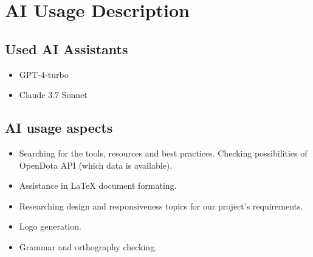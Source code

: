 \section{AI Usage Description}

\subsection{Used AI Assistants}

\begin{itemize}
    \item GPT-4-turbo
    \item Claude 3.7 Sonnet
\end{itemize}

\subsection{AI usage aspects}

\begin{itemize}

    \item Searching for the tools, resources and best practices. Checking possibilities of OpenDota API (which data is available).
    \item Assistance in \LaTeX{} document formating.
    \item Researching design and responsiveness topics for our project's requirements.
    \item Logo generation.
    \item Grammar and orthography checking.

\end{itemize}



